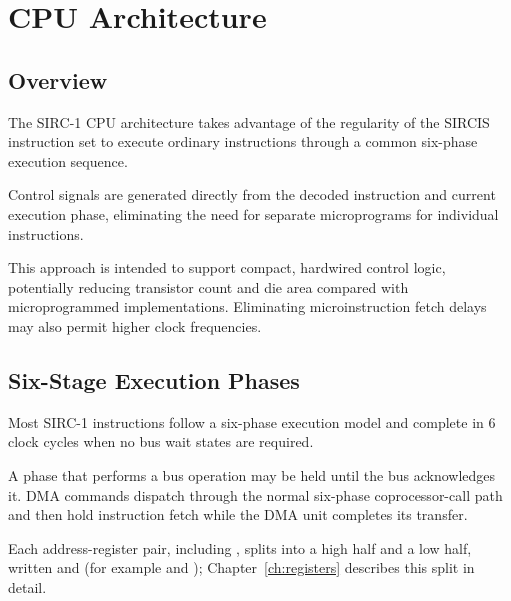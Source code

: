 \chapter{CPU Architecture}
\label{ch:cpu-architecture}

\section{Overview}

The SIRC-1 CPU architecture takes advantage of the regularity of the SIRCIS instruction set to execute ordinary
instructions through a common six-phase execution sequence.

Control signals are generated directly from the decoded instruction and current execution phase, eliminating the need
for separate microprograms for individual instructions.

This approach is intended to support compact, hardwired control logic, potentially reducing transistor count and die
area compared with microprogrammed implementations. Eliminating microinstruction fetch delays may also permit higher
clock frequencies.

\section{Six-Stage Execution Phases}

Most SIRC-1 instructions follow a six-phase execution model and complete in 6 clock cycles when no bus wait states are
required.

A phase that performs a bus operation may be held until the bus acknowledges it. DMA commands dispatch through the
normal six-phase coprocessor-call path and then hold instruction fetch while the DMA unit completes its transfer.

Each address-register pair, including , splits into a high half and a low half, written  and 
(for example  and ); Chapter~\ref{ch:registers} describes this split in detail.

